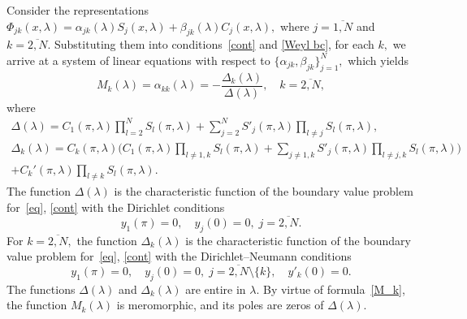 \documentclass[a4paper, 12pt] {article}
\theoremstyle{plain}
\theoremstyle{remark}
\theoremstyle{plain}
\theoremstyle{definition}
\numberwithin{equation}{section}
\begin{document}
Consider the representations $\Phi_{jk}(x, \lambda) = \alpha_{jk}(\lambda) S_{j}(x, \lambda) + \beta_{jk}(\lambda) C_j(x, \lambda),$ where $j=\overline{1, N}$ and $k=\overline{2, N}.$  Substituting them into conditions~\eqref{cont} and \eqref{Weyl bc}, for each $k,$ we arrive at a system of linear equations with respect to $\{ \alpha_{jk},\beta_{jk}\}_{j=1}^N,$ which yields 
\begin{equation} \label{M_k}
M_k(\lambda) = \alpha_{kk}(\lambda) = -\frac{\Delta_k(\lambda)}{\Delta(\lambda)}, \quad k=\overline{2, N},
\end{equation}
where
\begin{equation} \label{Delta}
\begin{split}
\Delta(\lambda) = C_1(\pi, \lambda)\prod_{l=2}^N S_l(\pi, \lambda) + \sum_{j=2}^N S'_j(\pi, \lambda)\prod_{l\ne j} S_l(\pi, \lambda), \\
\Delta_k(\lambda) = C_k(\pi, \lambda)\Big(C_1(\pi, \lambda)\prod_{l\ne 1,k} S_l(\pi, \lambda) + \sum_{j\ne1,k}S'_j(\pi, \lambda) \prod_{l\ne j,k}S_l(\pi, \lambda)\Big) \\
+ C_k'(\pi, \lambda)\prod_{l\ne k} S_l(\pi, \lambda).
\end{split}
\end{equation}
The function $\Delta(\lambda)$ is the characteristic function of the boundary value problem for~\eqref{eq}, \eqref{cont} with the Dirichlet conditions
$$y_1(\pi) = 0, \quad y_j(0) = 0, \; j = \overline{2, N}.$$
For $k=\overline{2, N},$ the function $\Delta_k(\lambda)$ is the characteristic function of the boundary value problem for~\eqref{eq}, \eqref{cont} with the Dirichlet--Neumann conditions
$$y_1(\pi) = 0, \quad y_j(0) = 0, \; j = \overline{2, N}\setminus\{k\}, \quad y'_k(0) = 0.$$
The functions $\Delta(\lambda)$ and $\Delta_k(\lambda)$ are entire in $\lambda.$
By virtue of formula~\eqref{M_k}, the function $M_k(\lambda)$ is meromorphic, and its poles are zeros of $\Delta(\lambda).$
\end{document}
